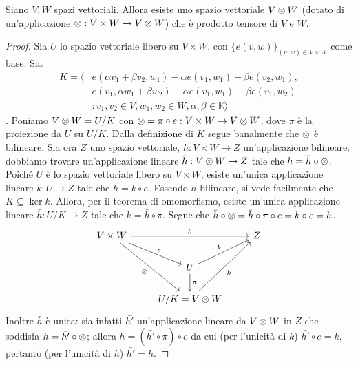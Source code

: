 \begin{proposition}
Siano $V\comma W$ spazi vettoriali. Allora esiste uno spazio vettoriale $V\otimes W$ (dotato di un'applicazione $\otimes:V\times W\to V\otimes W$) che è prodotto tensore di $V$ e $W$.
\end{proposition}
\begin{proof}
Sia $U$ lo spazio vettoriale libero su $V\times W$, con $\{e(v,w)\}_{(v,w)\in V\times W}$ come base. Sia
\begin{align*}
K=\langle&e(\alpha v_1+\beta v_2,w_1)-\alpha e(v_1,w_1)-\beta e(v_2,w_1),\\&e(v_1,\alpha w_1+\beta w_2)-\alpha e(v_1, w_1)-\beta e(v_1, w_2)\\&:v_1,v_2\in V,w_1,w_2\in W,\alpha,\beta\in\mathbb{K}\rangle
\end{align*}
. Poniamo $V\otimes W=U/K$ con $\otimes=\pi\circ e:V\times W\to V\otimes W$, dove $\pi$ è la proiezione da $U$ su $U/K$. Dalla definizione di $K$ segue banalmente che $\otimes$ è bilineare. Sia ora $Z$ uno spazio vettoriale, $h:V\times W\to Z$ un'applicazione bilineare; dobbiamo trovare un'applicazione lineare $\bar h:V\otimes W\to Z$ tale che $h=\bar h\circ\otimes$. Poiché $U$ è lo spazio vettoriale libero su $V\times W$, esiste un'unica applicazione lineare $k:U\to Z$ tale che $h=k\circ e$. Essendo $h$ bilineare, si vede facilmente che $K\subseteq\ker k$. Allora, per il teorema di omomorfismo, esiste un'unica applicazione lineare $\bar h:U/K\to Z$ tale che $k=\bar h\circ\pi$. Segue che $\bar h\circ \otimes=\bar h\circ\pi\circ e=k\circ e=h$.
$$
\begin{tikzcd}
V\times W\arrow[rr,"h"]\arrow[rd,"e"]\arrow[rdd,"\tensor",swap]&&Z\\
&U\arrow[ru,"k"]\arrow[d,"\pi"]\\
& U/K=V\tensor W\arrow[ruu,"\bar h",swap]
\end{tikzcd}
$$
Inoltre $\bar h$ è unica: sia infatti $\bar{h'}$ un'applicazione lineare da $V\otimes W$ in $Z$ che soddisfa $h=\bar{h'}\circ\otimes$; allora $h=(\bar{h'}\circ\pi)\circ e$ da cui (per l'unicità di $k$) $\bar{h'}\circ e=k$, pertanto (per l'unicità di $\bar h$) $\bar{h'}=\bar h$.
\end{proof}


